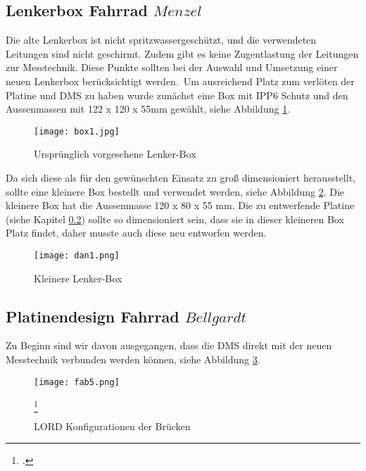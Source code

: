 \newpage{}
\subsection{Lenkerbox Fahrrad \(Menzel\)}
Die alte Lenkerbox ist nicht spritzwassergeschützt, und die verwendeten Leitungen sind nicht geschirmt.
Zudem gibt es keine Zugentlastung der Leitungen zur Messtechnik.
Diese Punkte sollten bei der Auswahl und Umsetzung einer neuen Lenkerbox berücksichtigt werden.\
Um ausreichend Platz zum verlöten der Platine und DMS zu haben wurde zunächst eine Box mit IPP6 Schutz und den Aussenmassen mit  122 x 120 x 55mm gewählt, siehe Abbildung \ref{fig:box1}.

\begin{figure}[h]
    \begin{center}
        \texttt{[image: box1.jpg]}
        \caption[Urspr\"unglich vorgesehene Lenker-Box (Abbildungsverzeichnis)]{Urspr\"unglich vorgesehene Lenker-Box}
        
        \label{fig:box1}
    \end{center}
\end{figure}

Da sich diese als für den gewünschten Einsatz zu groß dimensioniert herausstellt, sollte eine kleinere Box bestellt und verwendet werden, siehe Abbildung \ref{fig:dan1}.
Die kleinere Box hat die Aussenmasse 120 x 80 x 55 mm. Die zu entwerfende Platine (siehe Kapitel \ref{sec:fahrradplatine}) sollte so dimensioniert sein, dass sie in dieser kleineren Box Platz findet, daher musste auch diese neu entworfen werden.

\begin{figure}[h]
    \begin{center}
        \texttt{[image: dan1.png]}
        \caption[Kleinere Lenker-Box (Abbildungsverzeichnis)]{Kleinere Lenker-Box}
        
        \label{fig:dan1}
    \end{center}
\end{figure}

\newpage{}
\subsection{Platinendesign Fahrrad \(Bellgardt\)}
\label{sec:fahrradplatine}
Zu Beginn sind wir davon ausgegangen, dass die DMS direkt mit der neuen Messtechnik verbunden werden können, siehe Abbildung \ref{fig:fab5}.
\begin{figure}[h]
    \begin{center}
        \texttt{[image: fab5.png]}
        \caption[LORD Konfigurationen der Brücken (Abbildungsverzeichnis)]{LORD Konfigurationen der Brücken}
        \footcite{VLInkManual
        }
        
        \label{fig:fab5}
    \end{center}
\end{figure}

